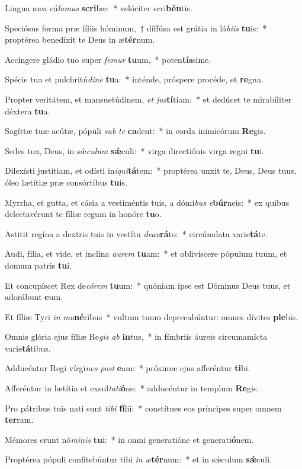 \item Lingua mea cá\textit{la}\textit{mus} \textbf{scri}bæ:~* velóciter scri\textbf{bén}tis.
\item Speciósus forma præ fíliis hóminum,~† diffúsa est grátia in lá\textit{bi}\textit{is} \textbf{tu}is:~* proptérea benedíxit te Deus in æ\textbf{tér}num.
\item Accíngere gládio tuo super \textit{fe}\textit{mur} \textbf{tu}um,~* poten\textbf{tís}sime.
\item Spécie tua et pulchritú\textit{di}\textit{ne} \textbf{tu}a:~* inténde, próspere procéde, et \textbf{re}gna.
\item Propter veritátem, et mansuetúdinem, \textit{et} \textit{jus}\textbf{tí}tiam:~* et dedúcet te mirabíliter déxtera \textbf{tu}a.
\item Sagíttæ tuæ acútæ, pópuli \textit{sub} \textit{te} \textbf{ca}dent:~* in corda inimicórum \textbf{Re}gis.
\item Sedes tua, Deus, in sǽ\textit{cu}\textit{lum} \textbf{sǽ}culi:~* virga directiónis virga regni \textbf{tu}i.
\item Dilexísti justítiam, et odísti in\textit{i}\textit{qui}\textbf{tá}tem:~* proptérea unxit te, Deus, Deus tuus, óleo lætítiæ præ consórtibus \textbf{tu}is.
\item Myrrha, et gutta, et cásia a vestiméntis tuis, a dómi\textit{bus} \textit{e}\textbf{búr}neis:~* ex quibus delectavérunt te fíliæ regum in honóre \textbf{tu}o.
\item Astitit regína a dextris tuis in vestítu \textit{de}\textit{au}\textbf{rá}to:~* circúmdata varie\textbf{tá}te.
\item Audi, fília, et vide, et inclína \textit{au}\textit{rem} \textbf{tu}am:~* et oblivíscere pópulum tuum, et domum patris \textbf{tu}i.
\item Et concupíscet Rex de\textit{có}\textit{rem} \textbf{tu}um:~* quóniam ipse est Dóminus Deus tuus, et adorábunt \textbf{e}um.
\item Et fíliæ Tyri \textit{in} \textit{mu}\textbf{né}ribus~* vultum tuum deprecabúntur: omnes dívites \textbf{ple}bis.
\item Omnis glória ejus fíliæ Re\textit{gis} \textit{ab} \textbf{in}tus,~* in fímbriis áureis circumamícta varie\textbf{tá}tibus.
\item Adducéntur Regi vírgi\textit{nes} \textit{post} \textbf{e}am:~* próximæ ejus afferéntur \textbf{ti}bi.
\item Afferéntur in lætítia et exsul\textit{ta}\textit{ti}\textbf{ó}ne:~* adducéntur in templum \textbf{Re}gis.
\item Pro pátribus tuis nati sunt \textit{ti}\textit{bi} \textbf{fí}lii:~* constítues eos príncipes super omnem \textbf{ter}ram.
\item Mémores erunt nó\textit{mi}\textit{nis} \textbf{tu}i:~* in omni generatióne et generati\textbf{ó}nem.
\item Proptérea pópuli confitebúntur tibi \textit{in} \textit{æ}\textbf{tér}num:~* et in sǽculum \textbf{sǽ}culi.
